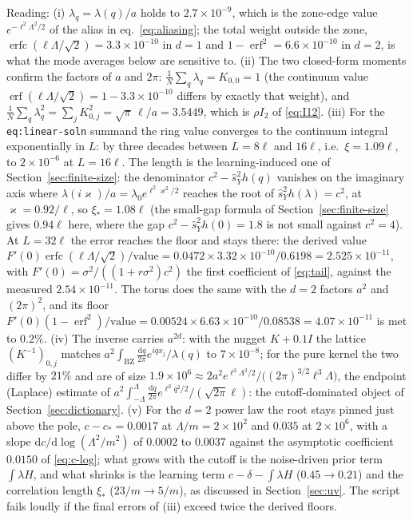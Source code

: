 \documentclass[11pt,a4paper]{article}
\newcommand{\dd}{\mathrm d}
\newcommand{\Lam}{\Lambda}
\newcommand{\sY}{\hat s_Y}
\begin{document}
Reading: (i) $\lambda_q = \lambda(q)/a$ holds to $2.7\times10^{-9}$, which is the zone-edge value $e^{-\ell^2\Lam^2/2}$ of the alias in eq.~\eqref{eq:aliasing}; the total weight outside the zone, $\operatorname{erfc}(\ell\Lam/\sqrt2) = 3.3\times10^{-10}$ in $d=1$ and $1-\operatorname{erf}^2 = 6.6\times10^{-10}$ in $d=2$, is what the mode averages below are sensitive to. (ii) The two closed-form moments confirm the factors of $a$ and $2\pi$: $\frac1N\sum_q\lambda_q = K_{0,0} = 1$ (the continuum value $\operatorname{erf}(\ell\Lam/\sqrt2) = 1-3.3\times10^{-10}$ differs by exactly that weight), and $\frac1N\sum_q\lambda_q^2 = \sum_jK_{0,j}^2 = \sqrt\pi\,\ell/a = 3.5449$, which is $\rho I_2$ of \eqref{eq:I12}. (iii) For the \texttt{eq:linear-soln} summand the ring value converges to the continuum integral exponentially in $L$: by three decades between $L = 8\ell$ and $16\ell$, i.e.\ $\xi = 1.09\ell$, to $2\times10^{-6}$ at $L = 16\ell$. The length is the learning-induced one of Section~\ref{sec:finite-size}: the denominator $c^2-\sY^2h(q)$ vanishes on the imaginary axis where $\lambda(i\varkappa)/a = \lambda_0e^{\ell^2\varkappa^2/2}$ reaches the root of $\sY^2h(\lambda) = c^2$, at $\varkappa = 0.92/\ell$, so $\xi_* = 1.08\ell$ (the small-gap formula of Section~\ref{sec:finite-size} gives $0.94\ell$ here, where the gap $c^2-\sY^2h(0) = 1.8$ is not small against $c^2 = 4$). At $L = 32\ell$ the error reaches the floor and stays there: the derived value $F'(0)\operatorname{erfc}(\ell\Lam/\sqrt2)/\text{value} = 0.0472\times3.32\times10^{-10}/0.6198 = 2.525\times10^{-11}$, with $F'(0) = \sigma^2/((1+r\sigma^2)c^2)$ the first coefficient of \eqref{eq:tail}, against the measured $2.54\times10^{-11}$. The torus does the same with the $d=2$ factors $a^2$ and $(2\pi)^2$, and its floor $F'(0)(1-\operatorname{erf}^2)/\text{value} = 0.00524\times6.63\times10^{-10}/0.08538 = 4.07\times10^{-11}$ is met to $0.2\%$. (iv) The inverse carries $a^{2d}$: with the nugget $K+0.1I$ the lattice $(K^{-1})_{0,j}$ matches $a^2\int_{\mathrm{BZ}}\frac{\dd q}{2\pi}e^{iqx_j}/\lambda(q)$ to $7\times10^{-8}$; for the pure kernel the two differ by $21\%$ and are of size $1.9\times10^6\approx2a^2e^{\ell^2\Lam^2/2}/\big((2\pi)^{3/2}\ell^3\Lam\big)$, the endpoint (Laplace) estimate of $a^2\int_{-\Lam}^{\Lam}\frac{\dd q}{2\pi}e^{\ell^2q^2/2}/(\sqrt{2\pi}\ell)$: the cutoff-dominated object of Section~\ref{sec:dictionary}. (v) For the $d=2$ power law the root stays pinned just above the pole, $c-c_* = 0.0017$ at $\Lam/m = 2\times10^2$ and $0.035$ at $2\times10^6$, with a slope $\dd c/\dd\log(\Lam^2/m^2)$ of $0.0002$ to $0.0037$ against the asymptotic coefficient $0.0150$ of \eqref{eq:c-log}; what grows with the cutoff is the noise-driven prior term $\int\lambda H$, and what shrinks is the learning term $c-\delta-\int\lambda H$ ($0.45\to0.21$) and the correlation length $\xi_*$ ($23/m\to5/m$), as discussed in Section~\ref{sec:uv}. The script fails loudly if the final errors of (iii) exceed twice the derived floors.
\end{document}
